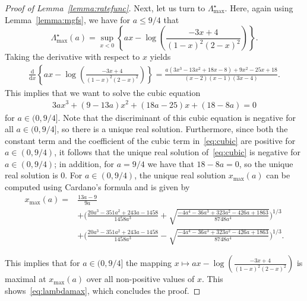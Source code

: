 \documentclass[11pt]{article}
\numberwithin{equation}{section}
\newcommand{\be}{\begin{equation}}
\newcommand{\ee}{\end{equation}}
\newcommand{\ba}{\begin{aligned}}
\newcommand{\ea}{\end{aligned}}
\newcommand{\dd}{\mathrm d}
\newcommand{\invisible}[1]{}
\theoremstyle{definition}
\begin{document}
\begin{proof}[Proof of Lemma~\ref{lemma:ratefunc}]
Next, let us turn to $\Lambda^{\star}_{\max}$. Here, again using Lemma~\ref{lemma:mgfs}, we have for $a \leq 9/4$ that 
\begin{equation}\label{eq:LDP Cramer max}
    \Lambda^{\star}_{\max}(a) = \sup_{x < 0} \left\{ ax - \log \left( \frac{-3x+4}{(1-x)^2(2-x)^2}  \right) 
 \right\}.
\end{equation}
Taking the derivative with respect to $x$  yields
\begin{align*}
    \frac{\dd}{\dd x} \left\{  ax - \log \left( \frac{-3x+4}{(1-x)^2(2-x)^2}  \right) \right\}
    =
    \frac{a(3x^3 - 13 x^2 + 18x -8) +9x^2 -25x + 18}{(x-2)(x-1)(3x-4)}.
\end{align*}
This implies that we want to solve the cubic equation
\begin{align}\label{eq:cubic}
    3ax^3+(9-13a)x^2+(18a-25)x+(18-8a) = 0
\end{align}
for $a \in (0,9/4]$. 
Note that the discriminant of this cubic equation is negative for all $a \in (0,9/4]$, 
so there is a unique real solution. 
Furthermore, 
since both the constant term and the coefficient of the cubic term in~\eqref{eq:cubic} 
are positive 
for $a \in (0, 9/4)$, 
it follows that the unique real solution of~\eqref{eq:cubic} is negative for $a \in (0, 9/4)$; 
in addition, for $a = 9/4$ we have that $18-8a = 0$, 
so the unique real solution is $0$. 
For $a \in (0,9/4)$, the unique real solution $x_{\max}(a)$ 
can be computed using Cardano's formula
and 
is given by
\be \ba\label{eq:xmax}
x_{\max}(a)={}&\frac{13a-9}{9a}\\
&+\Bigg(\frac{ 20 a^3 - 351 a^2 + 243 a - 1458}{1458a^3}+\sqrt{\frac{-4 a^4 - 36 a^3 + 323 a^2 - 426 a + 1863}{8748 a^4}}\Bigg)^{1/3}\\
&+\Bigg(\frac{20 a^3 - 351 a^2 + 243 a - 1458}{1458 a^3}-\sqrt{\frac{-4 a^4 - 36 a^3 + 323 a^2 - 426 a + 1863}{8748 a^4}}\Bigg)^{1/3}.
\ea \ee 
\invisible{
\begin{align*}
        & x_{\max}(a)  = \frac{13a-9}{9a}+  \Bigg( -\frac{-9\cdot 3a(9-13a)(18a-25)+27\cdot 9a^2(18-8a) + 2(9-13a)^3}{1458a^3} \\
        &+ \sqrt{ \left(\frac{-9\cdot 3a(9-13a)(18a-25)+27\cdot 9a^2(18-8a) + 2(9-13a)^3}{1458a^3}\right)^2 + \left( \frac{27a(18a-25)-3(9-13a)^2}{243a^2} \right)^3}\Bigg)^{1/3} \\
        &
        + \Bigg( -\frac{-9\cdot 3a(9-13a)(18a-25)+27\cdot 9a^2(18-8a) + 2(9-13a)^3}{1458a^3}  \\
        &- \sqrt{ \left(\frac{-9\cdot 3a(9-13a)(18a-25)+27\cdot 9a^2(18-8a) + 2(9-13a)^3}{1458a^3}\right)^2 + \left( \frac{27a(18a-25)-3(9-13a)^2}{243a^2} \right)^3} \Bigg)^{1/3}
\end{align*}
}
This implies that for $a \in (0, 9/4]$ the mapping $x\mapsto ax - \log \left( \frac{-3x+4}{(1-x)^2(2-x)^2}  \right)$ is maximal at $x_{\max}(a)$ over all non-positive values of $x$. 
This shows~\eqref{eq:lambdamax}, 
which concludes the proof.
\end{proof}
\end{document}
